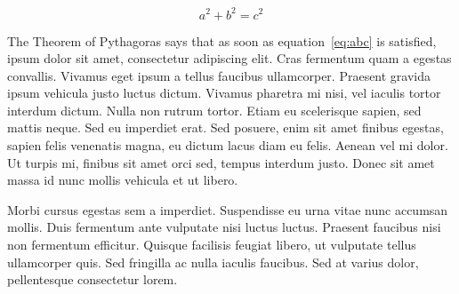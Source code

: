 \begin{equation}\label{eq:abc}
  a^2+b^2=c^2
\end{equation}

The Theorem of Pythagoras says that as soon as equation~\eqref{eq:abc} is satisfied, ipsum dolor sit amet, consectetur adipiscing elit. Cras fermentum quam a egestas convallis. Vivamus eget ipsum a tellus faucibus ullamcorper. Praesent gravida ipsum vehicula justo luctus dictum. Vivamus pharetra mi nisi, vel iaculis tortor interdum dictum. Nulla non rutrum tortor. Etiam eu scelerisque sapien, sed mattis neque. Sed eu imperdiet erat. Sed posuere, enim sit amet finibus egestas, sapien felis venenatis magna, eu dictum lacus diam eu felis. Aenean vel mi dolor. Ut turpis mi, finibus sit amet orci sed, tempus interdum justo. Donec sit amet massa id nunc mollis vehicula et ut libero.

Morbi cursus egestas sem a imperdiet. Suspendisse eu urna vitae nunc accumsan mollis. Duis fermentum ante vulputate nisi luctus luctus. Praesent faucibus nisi non fermentum efficitur. Quisque facilisis feugiat libero, ut vulputate tellus ullamcorper quis. Sed fringilla ac nulla iaculis faucibus. Sed at varius dolor, pellentesque consectetur lorem.


\cleardoublepage
